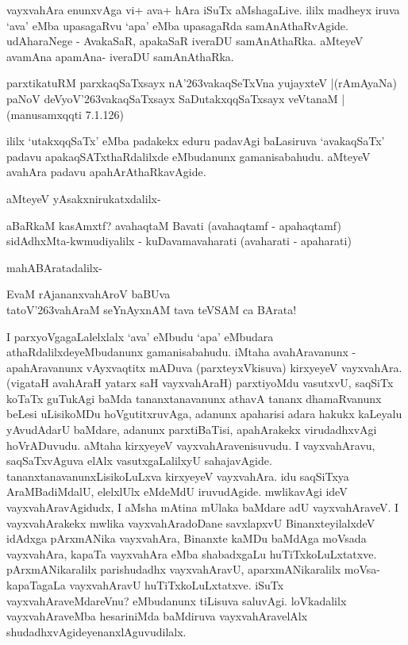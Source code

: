 vayxvahAra enunxvAga vi+ ava+ hAra iSuTx aMshagaLive. ililx madheyx iruva `ava' eMba upasagaRvu `apa' eMba upasagaRda samAnAthaRvAgide. udAharaNege - AvakaSaR, apakaSaR iveraDU samAnAthaRka. aMteyeV avamAna apamAna- iveraDU samAnAthaRka.

\begin{shloka}
parxtikatuRM parxkaqSaTxsayx nA\char'263vakaqSeTxVna yujayxteV |\hfill{(rAmAyaNa)}\\\label{223a}
paNoV deVyoV\char'263vakaqSaTxsayx SaDutakxqqSaTxsayx veVtanaM | \hfill{(manusamxqqti 7.1.126)}\label{223b}
\end{shloka}

ililx `utakxqqSaTx' eMba padakekx eduru padavAgi baLasiruva `avakaqSaTx' padavu apakaqSATxthaRdalilxde eMbudanunx gamanisabahudu. aMteyeV avahAra padavu apahArAthaRkavAgide.

aMteyeV yAsakxnirukatxdalilx-

\begin{shloka}
aBaRkaM kasAmxtf? avahaqtaM Bavati (avahaqtamf - apahaqtamf)\\\label{224}
sidAdhxMta-kwmudiyalilx - kuDavamavaharati (avaharati - apaharati)\\
\end{shloka}

mahABAratadalilx- 

\begin{shloka}
EvaM rAjananxvahAroV baBUva\\\label{224a}
tatoV\char'263vahAraM seYnAyxnAM tava teVSAM ca BArata!
\end{shloka}

I parxyoVgagaLalelxlalx `ava' eMbudu `apa' eMbudara athaRdalilxdeyeMbudanunx gamanisabahudu. iMtaha avahAravanunx - apahAravanunx vAyxvaqtitx mADuva (parxteyxVkisuva) kirxyeyeV vayxvahAra. (vigataH avahAraH yatarx saH vayxvahAraH) parxtiyoMdu vasutxvU, saqSiTx koTaTx guTukAgi baMda tananxtanavanunx athavA tananx dhamaRvanunx beLesi uLisikoMDu hoVgutitxruvAga, adanunx apaharisi adara hakukx kaLeyalu yAvudAdarU baMdare, adanunx parxtiBaTisi, apahArakekx virudadhxvAgi hoVrADuvudu. aMtaha kirxyeyeV vayxvahAravenisuvudu. I vayxvahAravu, saqSaTxvAguva elAlx vasutxgaLalilxyU sahajavAgide. tananxtanavanunxLisikoLuLxva kirxyeyeV vayxvahAra. idu saqSiTxya AraMBadiMdalU, elelxlUlx eMdeMdU iruvudAgide. mwlikavAgi ideV vayxvahAravAgidudx, I aMsha mAtina mUlaka baMdare adU vayxvahAraveV. I vayxvahArakekx mwlika vayxvahAradoDane savxlapxvU BinanxteyilalxdeV idAdxga pArxmANika vayxvahAra, Binanxte kaMDu baMdAga moVsada vayxvahAra, kapaTa vayxvahAra eMba shabadxgaLu huTiTxkoLuLxtatxve. pArxmANikaralilx parishudadhx vayxvahAravU, aparxmANikaralilx moVsa-kapaTagaLa vayxvahAravU huTiTxkoLuLxtatxve. iSuTx vayxvahAraveMdareVnu? eMbudanunx tiLisuva saluvAgi. loVkadalilx vayxvahAraveMba hesariniMda baMdiruva vayxvahAravelAlx shudadhxvAgideyenanxlAguvudilalx.

